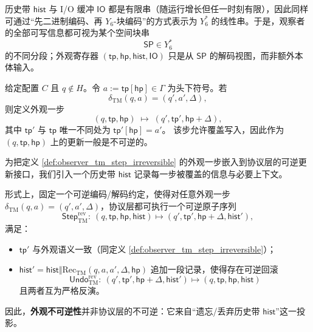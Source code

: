 \begin{remark}\label{rem:y6_hist_io_realizable}
历史带 \(\mathsf{hist}\) 与 I/O 缓冲 \(\mathsf{IO}\) 都是有限串（随运行增长但任一时刻有限），因此同样可通过“先二进制编码、再 \(Y_6\)-块编码”的方式表示为 \(Y_6^\ast\) 的线性串。于是，观察者的全部可写信息都可视为某个空间块串
$$
\mathsf{SP}\in Y_6^\ast
$$
的不同分段；外观寄存器 \((\mathsf{tp},\mathsf{hp},\mathsf{hist},\mathsf{IO})\) 只是从 \(\mathsf{SP}\) 的解码视图，而非额外本体输入。
\end{remark}

\begin{definition}\label{def:observer_tm_step_irreversible}
给定配置 \(C\) 且 \(q\notin H\)。令 \(a:=\mathsf{tp}[\mathsf{hp}]\in\Gamma\) 为头下符号。若
$$
\delta_{\mathrm{TM}}(q,a)=(q',a',\Delta),
$$
则定义外观一步
$$
(q,\mathsf{tp},\mathsf{hp})\;\mapsto\;(q',\mathsf{tp}',\mathsf{hp}+\Delta),
$$
其中 \(\mathsf{tp}'\) 与 \(\mathsf{tp}\) 唯一不同处为 \(\mathsf{tp}'[\mathsf{hp}]=a'\)。
该步允许覆盖写入，因此作为 \((q,\mathsf{tp},\mathsf{hp})\) 上的更新一般是不可逆的。
\end{definition}

\begin{definition}\label{def:observer_tm_bennett_embedding}
为把定义 \ref{def:observer_tm_step_irreversible} 的外观一步嵌入到协议层的可逆更新接口，我们引入一个历史带 \(\mathsf{hist}\) 记录每一步被覆盖的信息与必要上下文。

形式上，固定一个可逆编码/解码约定，使得对任意外观一步 \(\delta_{\mathrm{TM}}(q,a)=(q',a',\Delta)\)，协议层都可执行一个可逆原子序列
$$
\mathsf{Step}^{\mathrm{rev}}_{\mathrm{TM}}:\ (q,\mathsf{tp},\mathsf{hp},\mathsf{hist})\mapsto(q',\mathsf{tp}',\mathsf{hp}+\Delta,\mathsf{hist}'),
$$
满足：
\begin{itemize}
  \item \(\mathsf{tp}'\) 与外观语义一致（同定义 \ref{def:observer_tm_step_irreversible}）；
  \item \(\mathsf{hist}'=\mathsf{hist}\Vert \mathrm{Rec}_{\mathrm{TM}}(q,a,a',\Delta,\mathsf{hp})\) 追加一段记录，使得存在可逆回滚
  $$
  \mathsf{Undo}^{\mathrm{rev}}_{\mathrm{TM}}:\ (q',\mathsf{tp}',\mathsf{hp}+\Delta,\mathsf{hist}')\mapsto(q,\mathsf{tp},\mathsf{hp},\mathsf{hist})
  $$
  且两者互为严格反演。
\end{itemize}
因此，\textbf{外观不可逆性}并非协议层的不可逆：它来自“遗忘/丢弃历史带 \(\mathsf{hist}\)”这一投影。
\end{definition}

